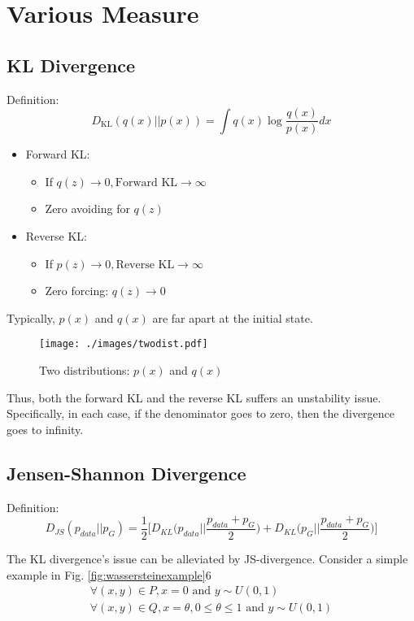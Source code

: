 \section{Various Measure}
\subsection{KL Divergence}
Definition:
$$D_\textrm{KL}(q(x)||p(x)) = \int q(x)\log \frac{q(x)}{p(x)}dx$$
\begin{itemize}
	\item Forward KL: 
	\begin{itemize}
		\item If $q(z)\rightarrow 0, \textrm{Forward KL}\rightarrow \infty$ 
		\item Zero avoiding for $q(z)$ 
	\end{itemize}
	\item Reverse KL:
	\begin{itemize}
		\item If $p(z)\rightarrow 0, \textrm{Reverse KL}\rightarrow \infty$ 
		\item Zero forcing: $q(z)\rightarrow 0$ 
	\end{itemize}
\end{itemize}

Typically, $p(x)$ and $q(x)$ are far apart at the initial state. 

\begin{figure}[h]
	\begin{center}
		\texttt{[image: ./images/twodist.pdf]}
	\end{center}
	\caption{Two distributions: $p(x)$ and $q(x)$}
	\label{fig:}
\end{figure}

Thus, both the forward KL and the reverse KL suffers an unstability issue. Specifically, in each case, if the denominator goes to zero, then the divergence goes to infinity. 

\subsection{Jensen-Shannon Divergence}

Definition:
$$D_{JS}(p_{data}||p_{G}) = \frac{1}{2}\Bigg[D_{KL}\Big(p_{data}\Big|\Big|\frac{p_{data}+p_{G}}{2}\Big)+D_{KL}\Big(p_{G}\Big|\Big|\frac{p_{data}+p_{G}}{2}\Big)\Bigg]$$

The KL divergence's issue can be alleviated by JS-divergence. Consider a simple example in Fig. \ref{fig:wassersteinexample}6
\begin{align*}
	\forall (x, y) \in P, x = 0 \text{ and } y \sim U(0, 1)\\
	\forall (x, y) \in Q, x = \theta, 0 \leq \theta \leq 1 \text{ and } y \sim U(0, 1)
\end{align*}

